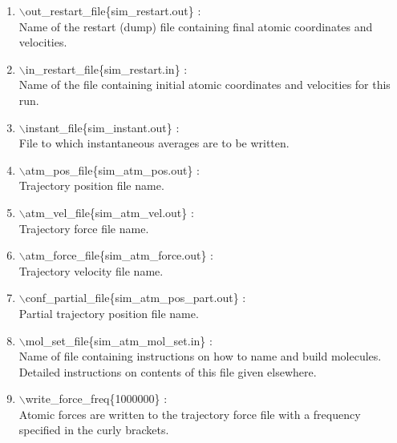 \documentclass[12pt,titlepage]{article}
\begin{document}
\begin{enumerate}
 \vspace{0.15in} 
 \item   $\backslash$out\_restart\_file\{sim\_restart.out\} : \\
   Name of the restart (dump) file containing final atomic 
          coordinates and velocities.

 \vspace{0.15in} 
 \item   $\backslash$in\_restart\_file\{sim\_restart.in\} : \\
     Name of the file containing initial atomic coordinates and
     velocities for this run.

 \vspace{0.15in} 
 \item   $\backslash$instant\_file\{sim\_instant.out\} : \\
     File to which instantaneous averages are to be written.

 \vspace{0.15in}
 \item   $\backslash$atm\_pos\_file\{sim\_atm\_pos.out\} : \\
     Trajectory position file name.

 \vspace{0.15in} 
 \item   $\backslash$atm\_vel\_file\{sim\_atm\_vel.out\} : \\
  Trajectory force file name.  

 \vspace{0.15in} 
 \item   $\backslash$atm\_force\_file\{sim\_atm\_force.out\} : \\
     Trajectory velocity file name.

 \vspace{0.15in}
 \item   $\backslash$conf\_partial\_file\{sim\_atm\_pos\_part.out\} : \\
     Partial trajectory position file name.

 \vspace{0.15in} 
 \item   $\backslash$mol\_set\_file\{sim\_atm\_mol\_set.in\} : \\
    Name of file containing instructions on how to name and build molecules.
    Detailed instructions on contents of this file given elsewhere.

 \vspace{0.15in} 
 \item   $\backslash$write\_force\_freq\{1000000\} : \\
   Atomic forces are written to the trajectory force file with a
   frequency specified in the curly brackets.


\end{enumerate}
\end{document}
